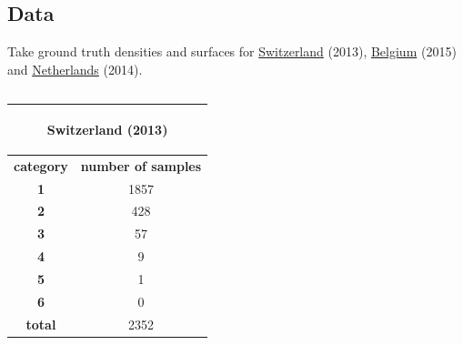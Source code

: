 \documentclass[c]{beamer}
\begin{document}
\subsection{Data}
\begin{frame}
\begin{itemize}
{\scriptsize
 \item Take ground truth densities and surfaces for \href{https://www.bfs.admin.ch/bfs/fr/home/statistiques/population/effectif-evolution/population.assetdetail.1401563.html}{Switzerland} (2013),
  \href{https://fr.wikipedia.org/wiki/Liste_des_communes_de_Belgique_par_population}{Belgium} (2015)  and \href{https://www.citypopulation.de/php/netherlands-admin.php}{Netherlands} (2014).
 \begin{columns}
  \begin{column}{0.33\textwidth}
   \begin{table}
   \begin{center}
   \begin{adjustbox}{max width=0.5\textwidth}
    \begin{tabular}{|c|c|}
      \hline
      \multicolumn{2}{|c|}{\begin{bf}Switzerland (2013)\end{bf}} \\
      \hline
      \textbf{category} & \textbf{number of samples}\\
      \hline
      \textbf{1} & 1857\\
      \hline
      \textbf{2} & 428\\
      \hline
      \textbf{3} & 57\\
      \hline
      \textbf{4} & 9\\
      \hline
      \textbf{5} & 1\\
      \hline
      \textbf{6} & 0 \\
      \hline
      \textbf{total} & 2352\\
      \hline
    \end{tabular}
   \end{adjustbox}
   \end{center}
   \end{table}
  \end{column}
  \begin{column}{0.33\textwidth}
   \begin{table}
   \begin{center}
   \begin{adjustbox}{max width=0.5\textwidth}
    \begin{tabular}{|c|c|}

\end{tabular}
\end{adjustbox}
\end{center}
\end{table}
\end{column}
\end{columns}}
\end{itemize}
\end{frame}
\end{document}
